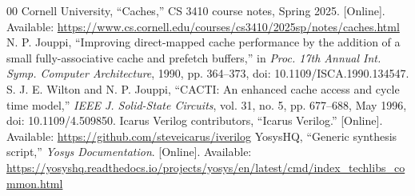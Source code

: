 \documentclass[conference]{IEEEtran}
\begin{document}
\begin{thebibliography}{00}
 Cornell University, ``Caches,'' CS 3410 course notes,
Spring 2025. [Online]. Available:
\url{https://www.cs.cornell.edu/courses/cs3410/2025sp/notes/caches.html}
 N. P. Jouppi, ``Improving direct-mapped cache performance
by the addition of a small fully-associative cache and prefetch buffers,''
in \emph{Proc. 17th Annual Int. Symp. Computer Architecture}, 1990,
pp. 364--373, doi: 10.1109/ISCA.1990.134547.
 S. J. E. Wilton and N. P. Jouppi, ``CACTI: An enhanced
cache access and cycle time model,'' \emph{IEEE J. Solid-State Circuits},
vol. 31, no. 5, pp. 677--688, May 1996, doi: 10.1109/4.509850.
 Icarus Verilog contributors, ``Icarus Verilog.'' [Online].
Available: \url{https://github.com/steveicarus/iverilog}
 YosysHQ, ``Generic synthesis script,'' \emph{Yosys
Documentation}. [Online]. Available:
\url{https://yosyshq.readthedocs.io/projects/yosys/en/latest/cmd/index_techlibs_common.html}
\end{thebibliography}
\end{document}
